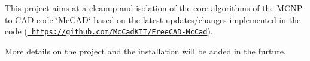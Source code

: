 This project aims at a cleanup and isolation of the core algorithms of the M\+C\+N\+P-\/to-\/\+C\+AD code \char`\"{}\+Mc\+C\+A\+D\char`\"{} based on the latest updates/changes implemented in the code (\href{https://github.com/McCadKIT/FreeCAD-McCad}{\texttt{ https\+://github.\+com/\+Mc\+Cad\+K\+I\+T/\+Free\+C\+A\+D-\/\+Mc\+Cad}}).

\DoxyHorRuler
 More details on the project and the installation will be added in the furture. 